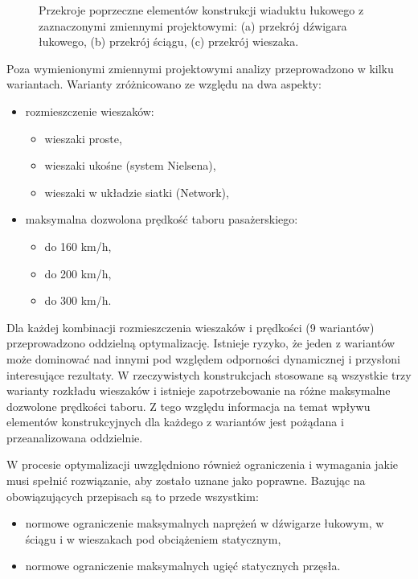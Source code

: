 \begin{figure}[h]
	\centering
	 \quad
	 \quad
	\captionsetup{justification=centering}
	\caption{Przekroje poprzeczne elementów konstrukcji wiaduktu łukowego z zaznaczonymi zmiennymi projektowymi: (a) przekrój dźwigara łukowego, (b) przekrój ściągu, (c) przekrój wieszaka.}
	\label{fig:wk2_opti_cs_elements}
\end{figure}

Poza wymienionymi zmiennymi projektowymi analizy przeprowadzono w kilku wariantach. Warianty zróżnicowano ze względu na dwa aspekty:
\begin{itemize}
	\item rozmieszczenie wieszaków: 
	\begin{itemize}
		\item wieszaki proste,
		\item wieszaki ukośne (system Nielsena), 
		\item wieszaki w układzie siatki (Network),
	\end{itemize}
	\item maksymalna dozwolona prędkość taboru pasażerskiego:
	\begin{itemize}
		\item do 160 km/h, 
		\item do 200 km/h,
		\item do 300 km/h.
	\end{itemize} 
\end{itemize}

Dla każdej kombinacji rozmieszczenia wieszaków i prędkości (9 wariantów) przeprowadzono oddzielną optymalizację. Istnieje ryzyko, że jeden z wariantów może dominować nad innymi pod względem odporności dynamicznej  i przysłoni interesujące rezultaty. W rzeczywistych konstrukcjach stosowane są wszystkie trzy warianty rozkładu wieszaków i istnieje zapotrzebowanie na różne maksymalne dozwolone prędkości taboru. Z tego względu informacja na temat wpływu elementów konstrukcyjnych dla każdego z wariantów jest pożądana i przeanalizowana oddzielnie.

W procesie optymalizacji uwzględniono również ograniczenia i wymagania jakie musi spełnić rozwiązanie, aby zostało uznane jako poprawne. Bazując na obowiązujących przepisach są to przede wszystkim:
\begin{itemize}
	\item normowe ograniczenie maksymalnych naprężeń w dźwigarze łukowym, w ściągu i w wieszakach pod obciążeniem statycznym,
	\item normowe ograniczenie maksymalnych ugięć statycznych przęsła.
\end{itemize}
